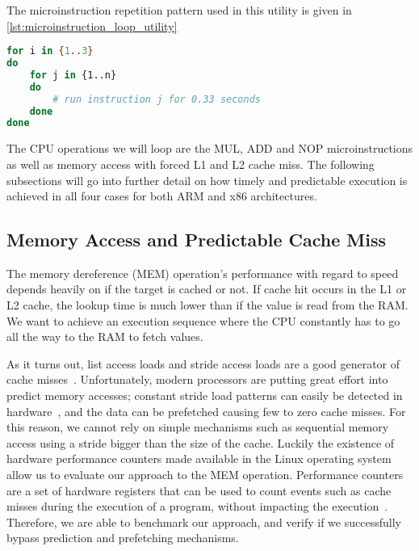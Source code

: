 The microinstruction repetition pattern used in this utility is given in \autoref{lst:microinstruction_loop_utility}

\begin{lstlisting}[language=BASH, caption={Mapping execution to the time domain: Microinstruction loop utility.}, label={lst:microinstruction_loop_utility}]
for i in {1..3}
do
	for j in {1..n}
	do
		# run instruction j for 0.33 seconds
	done
done
\end{lstlisting}

The \gls{CPU} operations we will loop are the MUL, ADD and NOP microinstructions as well as memory access with forced L1 and L2 cache miss.
The following subsections will go into further detail on how timely and predictable execution is achieved in all four cases for both ARM and x86 architectures.


\subsection{Memory Access and Predictable Cache Miss}\label{chp4:subsec:MEM_operation}
The memory dereference (MEM) operation's performance with regard to speed depends heavily on if the target is cached or not. 
If cache hit occurs in the L1 or L2 cache, the lookup time is much lower than if the value is read from the \gls{RAM}.
We want to achieve an execution sequence where the \gls{CPU} constantly has to go all the way to the RAM to fetch values.


As it turns out, list access loads and stride access loads are a good generator of cache misses~\cite{DBLP:conf/micro/OzawaKN95}.
Unfortunately, modern processors are putting great effort into predict memory accesses; constant stride load patterns can easily be detected in hardware~\cite{DBLP:journals/taco/LeeKV12}, and the data can be prefetched causing few to zero cache misses.
For this reason, we cannot rely on simple mechanisms such as sequential memory access using a stride bigger than the size of the cache.
Luckily the existence of hardware performance counters made available in the Linux operating system allow us to evaluate our approach to the MEM operation. 
Performance counters are a set of hardware registers that can be used to count events such as cache misses during the execution of a program, without impacting the execution~\cite{url:perf_wiki}.
Therefore, we are able to benchmark our approach, and verify if we successfully bypass prediction and prefetching mechanisms.

